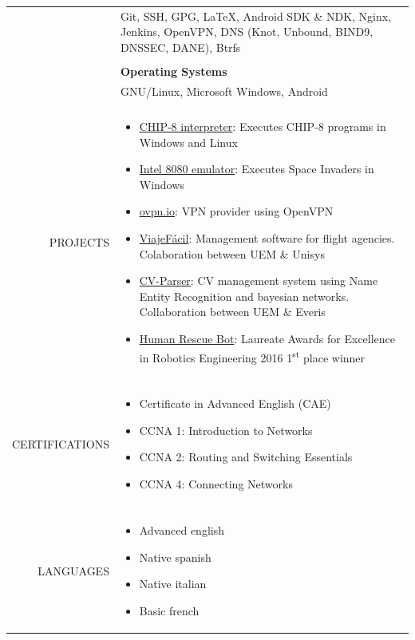 \documentclass[a4paper, 11pt]{article}
\begin{document}
\begin{longtable}{rp{11cm}}
    & Git, SSH, GPG, \LaTeX, Android SDK \& NDK, Nginx, Jenkins, OpenVPN, DNS (Knot, Unbound, BIND9, DNSSEC, DANE), Btrfs\\
    \\
    & {\bf Operating Systems}\\
    & GNU/Linux, Microsoft Windows, Android\\
    \\
    PROJECTS
    & \vspace{-8mm}
    \begin{itemize}[leftmargin=0cm,label={}]
        \item \href{https://github.com/hugo19941994/CHIP8-Emu}{CHIP-8 interpreter}: Executes CHIP-8 programs in Windows and Linux
        \item \href{https://github.com/hugo19941994/SpaceInvaders-Emu}{Intel 8080 emulator}: Executes Space Invaders in Windows
        \item \href{https://ovpn.io}{ovpn.io}: VPN provider using OpenVPN
        \item \href{https://github.com/hugo19941994/ViajeFacil}{ViajeFácil}: Management software for flight agencies. Colaboration between UEM \& Unisys
        \item \href{https://github.com/hugo19941994/CV-Parser}{CV-Parser}: CV management system using Name Entity Recognition and bayesian networks. Collaboration between UEM \& Everis
        \item \href{https://github.com/hugo19941994/robot}{Human Rescue Bot}: Laureate Awards for Excellence in Robotics Engineering 2016 1\textsuperscript{st} place winner
    \end{itemize}\\
    \\
    CERTIFICATIONS
    & \vspace{-8mm}
    \begin{itemize}[leftmargin=0cm,label={},noitemsep]
        \item Certificate in Advanced English (CAE)
        \item CCNA 1: Introduction to Networks
        \item CCNA 2: Routing and Switching Essentials
        \item CCNA 4: Connecting Networks
    \end{itemize}\\
    \\
    LANGUAGES
    & \vspace{-8mm}
    \begin{itemize}[leftmargin=0cm,label={},noitemsep]
        \item Advanced english
        \item Native spanish
        \item Native italian
        \item Basic french
    \end{itemize}
\end{longtable}
\end{document}
